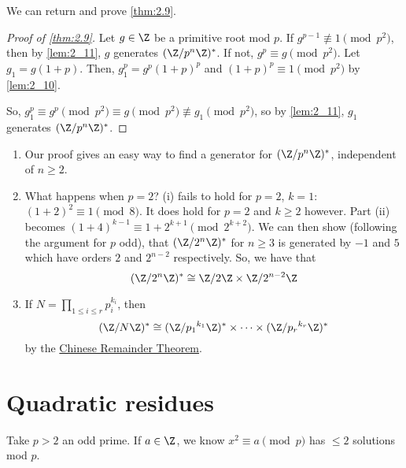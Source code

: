 \documentclass{article}
\begin{document}
We can return and prove \cref{thm:2.9}.

\begin{proof}[Proof of \cref{thm:2.9}\label{pf:2.9}]
    Let $g \in \Z$ be a primitive root mod $p$. If $g^{p-1} \not\equiv 1 \pmod{p^2}$, then by \cref{lem:2_11}, $g$ generates $(\Z/p^n \Z)^*$.
    If not, $g^p \equiv g \pmod{p^2}$. Let $g_1 = g(1 + p)$.
    Then, $g_1^p = g^p (1+p)^p$ and $(1+p)^p \equiv 1 \pmod{p^2}$ by \cref{lem:2_10}.

    So, $g_1^p \equiv g^p \pmod{p^2} \equiv g \pmod{p^2} \not\equiv g_1 \pmod{p^2}$, so by \cref{lem:2_11}, $g_1$ generates $(\Z/p^n \Z)^*$.
\end{proof}

\begin{remark}
    \leavevmode
    \begin{enumerate}
        \item Our proof gives an easy way to find a generator for $(\Z / p^n \Z)^*$, independent of $n \geq 2$.
        \item What happens when $p=2$? (i) fails to hold for $p=2$, $k=1$: $(1+2)^2 \equiv 1 \pmod{8}$.  It does hold for $p=2$ and $k \geq 2$ however. Part (ii) becomes $(1+4)^{k-1} \equiv 1 + 2^{k+1} \pmod{2^{k+2}}$.
            We can then show (following the argument for $p$ odd), that $(\Z/2^n \Z)^*$ for $n \geq 3$ is generated by $-1$ and $5$ which have orders $2$ and $2^{n-2}$ respectively.
            So, we have that
            \begin{equation*}
                (\Z/2^n \Z)^* \cong \Z/2\Z \times \Z/2^{n-2} \Z
            \end{equation*}
        \item If $N = \prod_{1 \leq i \leq r} p_i^{k_i}$, then
            \begin{equation*}
                (\Z/N \Z)^* \cong (\Z/{p_1}^{k_1} \Z)^* \times \dotsm \times (\Z/{p_r}^{k_r} \Z)^*
            \end{equation*}
            by the \hyperlink{thm:crt}{Chinese Remainder Theorem}.
    \end{enumerate}
\end{remark}

\clearpage

\section{Quadratic residues}
Take $p > 2$ an odd prime. If $a \in \Z$, we know $x^2 \equiv a \pmod{p}$ has $\leq 2$ solutions mod $p$.
\end{document}
